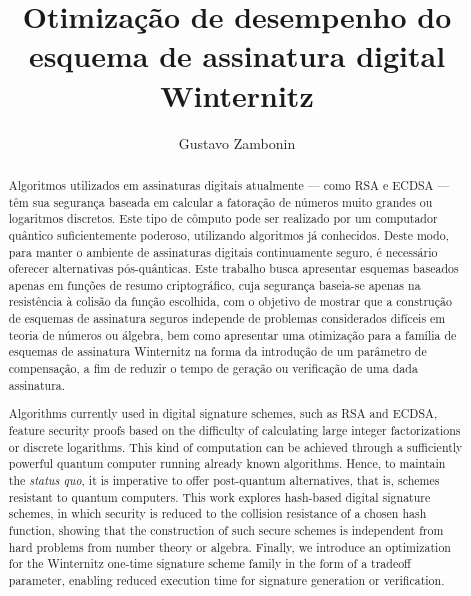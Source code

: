 \documentclass[12pt,notitlepage]{report}
\title{
  Otimização de desempenho do esquema de assinatura digital Winternitz
}
\author{Gustavo Zambonin}
\date{}
\begin{document}
\maketitle

\begin{abstract}
Algoritmos utilizados em assinaturas digitais atualmente --- como RSA e ECDSA --- têm sua segurança baseada em calcular a fatoração de números muito grandes ou logaritmos discretos. Este tipo de cômputo pode ser realizado por um computador quântico suficientemente poderoso, utilizando algoritmos já conhecidos. Deste modo, para manter o ambiente de assinaturas digitais continuamente seguro, é necessário oferecer alternativas pós-quânticas. Este trabalho busca apresentar esquemas baseados apenas em funções de resumo criptográfico, cuja segurança baseia-se apenas na resistência à colisão da função escolhida, com o objetivo de mostrar que a construção de esquemas de assinatura seguros independe de problemas considerados difíceis em teoria de números ou álgebra, bem como apresentar uma otimização para a família de esquemas de assinatura Winternitz na forma da introdução de um parâmetro de compensação, a fim de reduzir o tempo de geração ou verificação de uma dada assinatura.
\end{abstract}

\begin{otherlanguage}{english} 
\begin{abstract}
Algorithms currently used in digital signature schemes, such as RSA and ECDSA,
feature security proofs based on the difficulty of calculating large integer
factorizations or discrete logarithms. This kind of computation can be achieved
through a sufficiently powerful quantum computer running already known algorithms.
Hence, to maintain the \emph{status quo}, it is imperative to offer post-quantum
alternatives, that is, schemes resistant to quantum computers. This work explores
hash-based digital signature schemes, in which security is reduced to the collision
resistance of a chosen hash function, showing that the construction of such secure
schemes is independent from hard problems from number theory or algebra. Finally,
we introduce an optimization for the Winternitz one-time signature scheme family
in the form of a tradeoff parameter, enabling reduced execution time for signature
generation or verification.
\end{abstract}
\end{otherlanguage}

\tableofcontents
\end{document}
